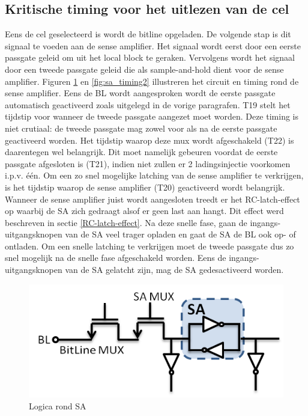\subsection{Kritische timing voor het uitlezen van de cel}
Eens de cel geselecteerd is wordt de bitline opgeladen. De volgende stap is dit signaal te voeden aan de sense amplifier. Het signaal wordt eerst door een eerste passgate geleid om uit het local block te geraken. Vervolgens wordt het signaal door een tweede passgate geleid die als sample-and-hold dient voor de sense amplifier. Figuren \ref{fig:sa_timing1} en \ref{fig:sa_timing2} illustreren het circuit en timing rond de sense amplifier. Eens de BL wordt aangesproken wordt de eerste passgate automatisch geactiveerd zoals uitgelegd in de vorige paragrafen. T19 stelt het tijdstip voor wanneer de tweede passgate aangezet moet worden. Deze timing is niet crutiaal: de tweede passgate mag zowel voor als na de eerste passgate geactiveerd worden. Het tijdstip waarop deze mux wordt afgeschakeld (T22) is daarentegen wel belangrijk. Dit moet namelijk gebeuren voordat de eerste passgate afgesloten is (T21), indien niet zullen er 2 ladingsinjectie voorkomen i.p.v. één. Om een zo snel mogelijke latching van de sense amplifier te verkrijgen, is het tijdstip waarop de sense amplifier (T20) geactiveerd wordt belangrijk. Wanneer de sense amplifier juist wordt aangesloten treedt er het RC-latch-effect op waarbij de SA zich gedraagt alsof er geen last aan hangt. Dit effect werd beschreven in sectie \ref{RC-latch-effect}. Na deze snelle fase, gaan de ingangs-uitgangsknopen van de SA veel trager opladen en gaat de SA de BL ook op- of ontladen. Om een snelle latching te verkrijgen moet de tweede passgate dus zo snel mogelijk na de snelle fase afgeschakeld worden. Eens de ingangs-uitgangsknopen van de SA gelatcht zijn, mag de SA gedesactiveerd worden.

\begin{figure}[!ht]
  \centering
  \includegraphics[scale=0.6]{../fig/hfdstk-timing-sa1.png}
  \caption{Logica rond SA}
  \label{fig:sa_timing1}
\end{figure}

